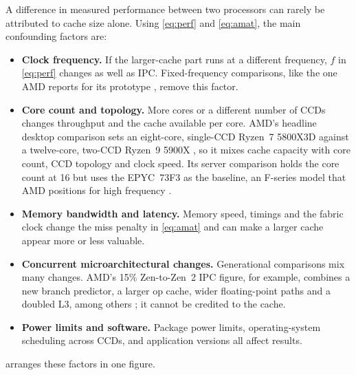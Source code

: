 A difference in measured performance between two processors can rarely be attributed to cache size alone. Using \cref{eq:perf} and \cref{eq:amat}, the main confounding factors are:
\begin{itemize}
  \item \textbf{Clock frequency.} If the larger-cache part runs at a different frequency, $f$ in \cref{eq:perf} changes as well as IPC. Fixed-frequency comparisons, like the one AMD reports for its prototype \cite{swaminathanAdvancedPackagingEnabling2021}, remove this factor.
  \item \textbf{Core count and topology.} More cores or a different number of CCDs changes throughput and the cache available per core. AMD's headline desktop comparison sets an eight-core, single-CCD Ryzen~7 5800X3D against a twelve-core, two-CCD Ryzen~9 5900X \cite[slide~29]{wuu2022vcache}, so it mixes cache capacity with core count, CCD topology and clock speed. Its server comparison holds the core count at 16 but uses the EPYC~73F3 as the baseline, an F-series model that AMD positions for high frequency \cite{amd2022epyc7003,wuu2022vcache}.
  \item \textbf{Memory bandwidth and latency.} Memory speed, timings and the fabric clock change the miss penalty in \cref{eq:amat} and can make a larger cache appear more or less valuable.
  \item \textbf{Concurrent microarchitectural changes.} Generational comparisons mix many changes. AMD's 15\% Zen-to-Zen~2 IPC figure, for example, combines a new branch predictor, a larger op cache, wider floating-point paths and a doubled L3, among others \cite{suggs2019zen2}; it cannot be credited to the cache.
  \item \textbf{Power limits and software.} Package power limits, operating-system scheduling across CCDs, and application versions all affect results.
\end{itemize}

 arranges these factors in one figure.

